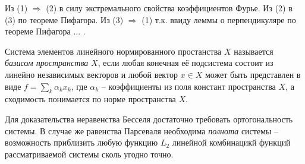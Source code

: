 \begin{uproof}
Из (1) $\Rightarrow$ (2) в силу экстремального свойства коэффициентов Фурье. Из (2) в (3) по теореме Пифагора. Из (3) $\Rightarrow$ (1) т.к. ввиду леммы о перпендикуляре по теореме Пифагора ...
.
\end{uproof}



\begin{to_def}
    Система элементов линейного нормированного простанства $X$ называется \textit{базисом пространства} $X$, если любая конечная её подсистема состоит из линейно независимых векторов и любой вектор $x \in X$ может быть представлен в виде $f = \sum_k \alpha_k x_k$, где $\alpha_k$ -- коэффициенты из поля констант пространства $X$, а сходимость понимается по норме пространства $X$. 
\end{to_def}






Для доказательства неравенства Бесселя достаточно требовать ортогональность системы. В случае же равенства Парсеваля необходима \textit{полнота} системы -- возможность приблизить любую функцию $L_2$ линейной комбинацикй функций рассматриваемой системы сколь угодно точно. 



